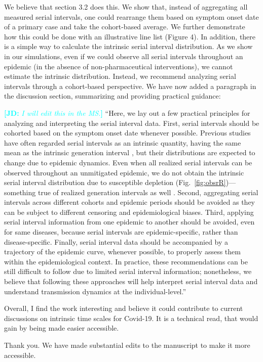 \documentclass[12pt]{article}
\newcommand{\fref}[1]{Fig.~\ref{fig:#1}}
\newcommand{\revtext}{\textsf}
\newcommand{\comment}[3]{\textcolor{#1}{\textbf{[#2: }\textsl{#3}\textbf{]}}}
\newcommand{\jd}[1]{\comment{cyan}{JD}{#1}}
\begin{document}
We believe that section 3.2 does this. We show that, instead of aggregating all measured serial intervals, one could rearrange them based on symptom onset date of a primary case and take the cohort-based average. We further demonstrate how this could be done with an illustrative line list (Figure 4). In addition, there is a simple way to calculate the intrinsic serial interval distribution. As we show in our simulations, even if we could observe all serial intervals throughout an epidemic (in the absence of non-pharmaceutical interventions), we cannot estimate the intrinsic distribution. Instead, we recommend analyzing serial intervals through a cohort-based perspective. We have now added a paragraph in the discussion section, summarizing and providing practical guidance:

\jd{I will edit this in the MS.}
``Here, we lay out a few practical principles for analyzing and interpreting the serial interval data.
First, serial intervals should be cohorted based on the symptom onset date whenever possible.
Previous studies have often regarded serial intervals as an intrinsic quantity, having the same mean as the intrinsic generation interval \citep{svensson2007note,klinkenberg2011correlation,champredon2018equivalence, britton2019estimation}, but their distributions are expected to change due to epidemic dynamics.
Even when all realized serial intervals can be observed throughout an unmitigated epidemic, we do not obtain the intrinsic serial interval distribution due to susceptible depletion (\fref{obsrR})---something true of realized generation intervals as well \citep{park2020inferring}.
Second, aggregating serial intervals across different cohorts and epidemic periods should be avoided as they can be subject to different censoring and epidemiological biases.
Third, applying serial interval information from one epidemic to another should be avoided, even for same diseases, because serial intervals are epidemic-specific, rather than disease-specific.
Finally, serial interval data should be accompanied by a trajectory of the epidemic curve, whenever possible, to properly assess them within the epidemiological context.
In practice, these recommendations can be still difficult to follow due to limited serial interval information;
nonetheless, we believe that following these approaches will help interpret serial interval data and understand transmission dynamics at the individual-level.''

\revtext{Overall, I find the work interesting and believe it could contribute to current discussions on intrinsic time scales for Covid-19. It is a technical read, that would gain by being made easier accessible.}

Thank you. We have made substantial edits to the manuscript to make it more accessible.


\end{document}
